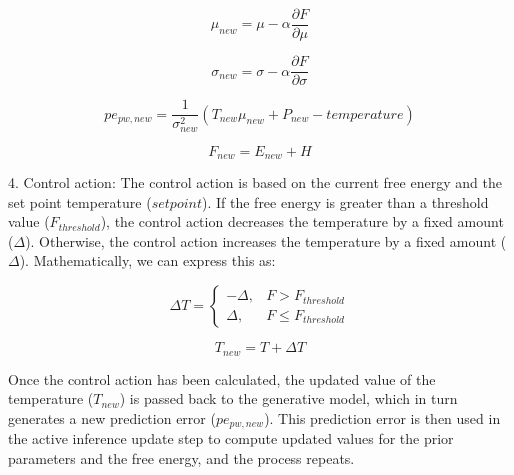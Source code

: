 \documentclass{article}
\begin{document}
\begin{equation}
\mu_{new} = \mu - \alpha\frac{\partial F}{\partial \mu}
\end{equation}

\begin{equation}
\sigma_{new} = \sigma - \alpha\frac{\partial F}{\partial \sigma}
\end{equation}

\begin{equation}
pe_{pw,new} = \frac{1}{\sigma_{new}^2}(T_{new}\mu_{new} + P_{new} - temperature)
\end{equation}

\begin{equation}
F_{new} = E_{new} + H
\end{equation}

4. Control action:
The control action is based on the current free energy and the set point temperature ($setpoint$). If the free energy is greater than a threshold value ($F_{threshold}$), the control action decreases the temperature by a fixed amount ($\Delta$). Otherwise, the control action increases the temperature by a fixed amount ($\Delta$). Mathematically, we can express this as:

$$\Delta T = \begin{cases} -\Delta, & F > F_{threshold} \\ \Delta, & F \leq F_{threshold} \end{cases}$$

$$T_{new} = T + \Delta T$$

Once the control action has been calculated, the updated value of the temperature ($T_{new}$) is passed back to the generative model, which in turn generates a new prediction error ($pe_{pw,new}$). This prediction error is then used in the active inference update step to compute updated values for the prior parameters and the free energy, and the process repeats.
\end{document}

